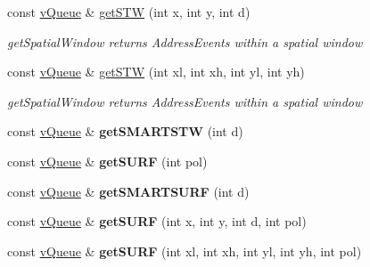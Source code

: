 \begin{DoxyCompactItemize}
\item 
const \hyperlink{classemorph_1_1vQueue}{v\-Queue} \& \hyperlink{classemorph_1_1vWindow_a49b43ccdd801608a72f962a2db9b9fc6}{get\-S\-T\-W} (int x, int y, int d)
\begin{DoxyCompactList}\small\item\em get\-Spatial\-Window returns Address\-Events within a spatial window \end{DoxyCompactList}\item 
const \hyperlink{classemorph_1_1vQueue}{v\-Queue} \& \hyperlink{classemorph_1_1vWindow_aa6691b1453a5abff9d16001b314ee3ae}{get\-S\-T\-W} (int xl, int xh, int yl, int yh)
\begin{DoxyCompactList}\small\item\em get\-Spatial\-Window returns Address\-Events within a spatial window \end{DoxyCompactList}\item 
\hypertarget{classemorph_1_1vWindow_a4ad3e6a65dea8ad0cf52b03ef41fe8fb}{const \hyperlink{classemorph_1_1vQueue}{v\-Queue} \& {\bfseries get\-S\-M\-A\-R\-T\-S\-T\-W} (int d)}\label{classemorph_1_1vWindow_a4ad3e6a65dea8ad0cf52b03ef41fe8fb}

\item 
\hypertarget{classemorph_1_1vWindow_ad03a49288c115cfec54462d356606033}{const \hyperlink{classemorph_1_1vQueue}{v\-Queue} \& {\bfseries get\-S\-U\-R\-F} (int pol)}\label{classemorph_1_1vWindow_ad03a49288c115cfec54462d356606033}

\item 
\hypertarget{classemorph_1_1vWindow_a7c4dd7d2f436537552b9d0c42c1263b3}{const \hyperlink{classemorph_1_1vQueue}{v\-Queue} \& {\bfseries get\-S\-M\-A\-R\-T\-S\-U\-R\-F} (int d)}\label{classemorph_1_1vWindow_a7c4dd7d2f436537552b9d0c42c1263b3}

\item 
\hypertarget{classemorph_1_1vWindow_a97de6f3768adfe0fe87c9d538effe944}{const \hyperlink{classemorph_1_1vQueue}{v\-Queue} \& {\bfseries get\-S\-U\-R\-F} (int x, int y, int d, int pol)}\label{classemorph_1_1vWindow_a97de6f3768adfe0fe87c9d538effe944}

\item 
\hypertarget{classemorph_1_1vWindow_ae73175dc01dfe590770deedc14057f28}{const \hyperlink{classemorph_1_1vQueue}{v\-Queue} \& {\bfseries get\-S\-U\-R\-F} (int xl, int xh, int yl, int yh, int pol)}\label{classemorph_1_1vWindow_ae73175dc01dfe590770deedc14057f28}

\end{DoxyCompactItemize}


